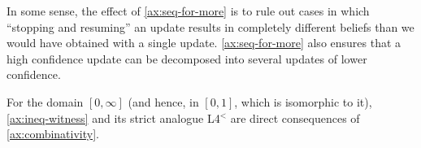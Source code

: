  In some sense, the effect of \cref{ax:seq-for-more} is to rule out cases 
 in which ``stopping and resuming'' an update 
 results in completely different beliefs than we would have obtained with a single update. 
 \cref{ax:seq-for-more} also ensures
 	that a high confidence update can be decomposed into
 	several updates of lower confidence. 
 \begin{center}
 \end{center}
 For the domain $[0,\infty]$ (and hence, in $[0,1]$, which is isomorphic to it), \cref{ax:ineq-witness} and its strict analogue L4{$^{<}$}
 are direct consequences of \cref{ax:combinativity}. 



